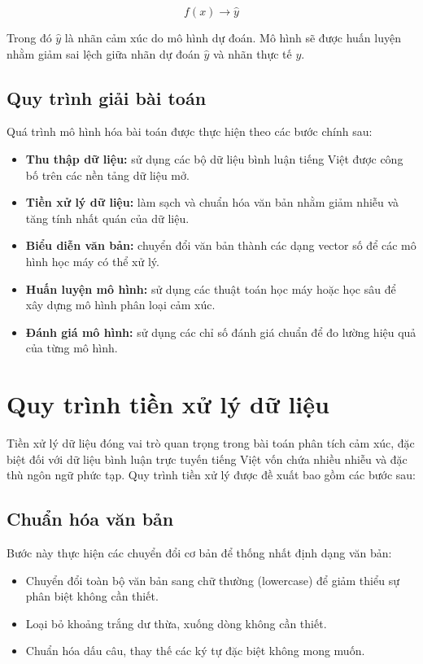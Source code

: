 \documentclass[14pt, a4paper]{report}
\begin{document}
\begin{equation}
f(x) \rightarrow \hat{y}
\end{equation}

Trong đó $\hat{y}$ là nhãn cảm xúc do mô hình dự đoán. Mô hình sẽ được huấn luyện nhằm giảm sai lệch giữa nhãn dự đoán $\hat{y}$ và nhãn thực tế $y$.

\subsection{Quy trình giải bài toán}

Quá trình mô hình hóa bài toán được thực hiện theo các bước chính sau:

\begin{itemize}
    \item \textbf{Thu thập dữ liệu:} sử dụng các bộ dữ liệu bình luận tiếng Việt được công bố trên các nền tảng dữ liệu mở.
    \item \textbf{Tiền xử lý dữ liệu:} làm sạch và chuẩn hóa văn bản nhằm giảm nhiễu và tăng tính nhất quán của dữ liệu.
    \item \textbf{Biểu diễn văn bản:} chuyển đổi văn bản thành các dạng vector số để các mô hình học máy có thể xử lý.
    \item \textbf{Huấn luyện mô hình:} sử dụng các thuật toán học máy hoặc học sâu để xây dựng mô hình phân loại cảm xúc.
    \item \textbf{Đánh giá mô hình:} sử dụng các chỉ số đánh giá chuẩn để đo lường hiệu quả của từng mô hình.
\end{itemize}

\section{Quy trình tiền xử lý dữ liệu}

Tiền xử lý dữ liệu đóng vai trò quan trọng trong bài toán phân tích cảm xúc, đặc biệt đối với dữ liệu bình luận trực tuyến tiếng Việt vốn chứa nhiều nhiễu và đặc thù ngôn ngữ phức tạp. Quy trình tiền xử lý được đề xuất bao gồm các bước sau:

\subsection{Chuẩn hóa văn bản}

Bước này thực hiện các chuyển đổi cơ bản để thống nhất định dạng văn bản:

\begin{itemize}
    \item Chuyển đổi toàn bộ văn bản sang chữ thường (lowercase) để giảm thiểu sự phân biệt không cần thiết.
    \item Loại bỏ khoảng trắng dư thừa, xuống dòng không cần thiết.
    \item Chuẩn hóa dấu câu, thay thế các ký tự đặc biệt không mong muốn.
\end{itemize}
\end{document}
